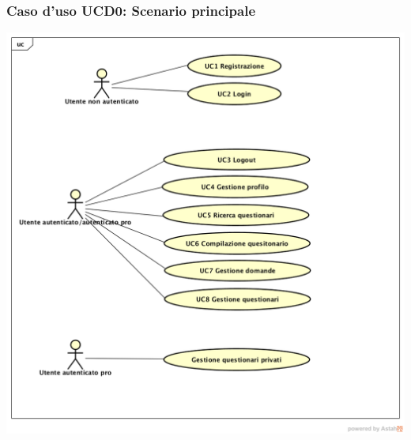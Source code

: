 

\subsubsection{Caso d'uso UCD0: Scenario principale}
\begin{center}
\includegraphics[scale=0.5]{../../UML/UC0.png}
\end{center}
